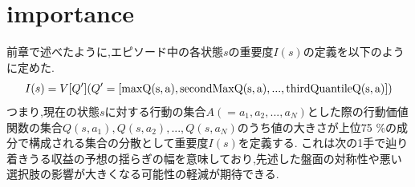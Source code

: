 \section{importance}
前章で述べたように,エピソード中の各状態$s$の重要度$I(s)$の定義を以下のように定めた.
\begin{equation}
    \label{new-imp}
	{I(s)=V[Q'] (Q'=[\rm{max}Q(s, a), \rm{secondMax}Q(s, a), ..., \rm{thirdQuantile}Q(s, a)])}
\end{equation}
つまり,現在の状態$s$に対する行動の集合$A(={a_1, a_2, ..., a_N})$とした際の行動価値関数の集合${Q(s, a_1), Q(s, a_2), ..., Q(s, a_N)}$のうち値の大きさが上位75
\%の成分で構成される集合の分散として重要度$I(s)$を定義する.
これは次の1手で辿り着きうる収益の予想の揺らぎの幅を意味しており,先述した盤面の対称性や悪い選択肢の影響が大きくなる可能性の軽減が期待できる.

